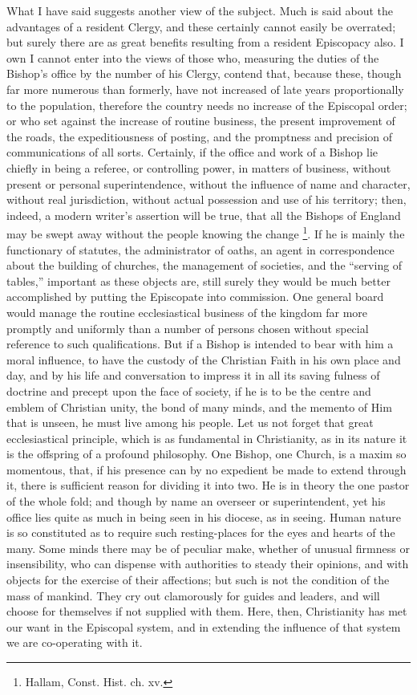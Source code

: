 What I have said suggests another view of the
subject. Much is said about the advantages of a resident Clergy, and
these certainly cannot easily be overrated; but surely there are as
great benefits resulting from a resident Episcopacy also. I own I
cannot enter into the views of those who, measuring the duties of the
Bishop's office by the number of his Clergy, contend that, because
these, though far more numerous than formerly, have not increased of
late years proportionally to the population, therefore the country
needs no increase of the Episcopal order; or who set against the
increase of routine business, the present improvement of the roads,
the expeditiousness of posting, and the promptness and precision of
communications of all sorts. Certainly, if the office and work of a
Bishop lie chiefly in being a referee, or controlling power, in
matters of business, without present or personal superintendence,
without the influence of name and character, without real
jurisdiction, without actual possession and use of his territory;
then, indeed, a modern writer's assertion will be true, that all the
Bishops of England may be swept away without the people knowing the
change \footnote{Hallam, Const. Hist. ch. xv.}. If he is mainly
the functionary of statutes, the administrator of oaths, an agent in
correspondence about the building of churches, the management of
societies, and the ``serving of tables,'' important as these objects
are, still surely they would be much better accomplished by putting
the Episcopate into commission. One general board would manage the
routine ecclesiastical business of the kingdom far more promptly and
uniformly than a number of persons chosen without special reference to
such qualifications. But if a Bishop is intended to bear with him a
moral influence, to have the custody of the Christian Faith in his own
place and day, and by his life and conversation to impress it in all
its saving fulness of doctrine and precept upon the face of society,
if he is to be the centre and emblem of Christian unity, the bond of
many minds, and the memento of Him that is unseen, he must live among
his people. Let us not forget that great ecclesiastical principle,
which is as fundamental in Christianity, as in its nature it is the
offspring of a profound philosophy. One Bishop, one Church, is a maxim
so momentous, that, if his presence can by no expedient be made to
extend through it, there is sufficient reason for dividing it into
two. He is in theory the one pastor of the whole fold; and though by
name an overseer or superintendent, yet his office lies quite as much
in being seen in his diocese, as in seeing. Human nature is so
constituted as to require such resting-places for the eyes and hearts
of the many. Some minds there may be of peculiar make, whether of
unusual firmness or insensibility, who can dispense with
authorities to steady their opinions, and with objects for the
exercise of their affections; but such is not the condition of the
mass of mankind. They cry out clamorously for guides and leaders, and
will choose for themselves if not supplied with them. Here, then,
Christianity has met our want in the Episcopal system, and in
extending the influence of that system we are co-operating with it.

